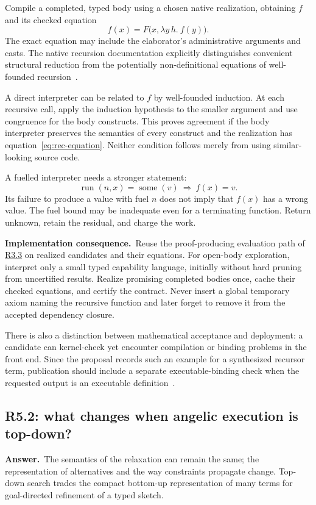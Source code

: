 \documentclass[11pt,a4paper]{article}
\theoremstyle{definition}
\theoremstyle{remark}
\newcommand{\ans}{\noindent\textbf{Answer.}\ }
\newcommand{\imp}{\par\noindent\textbf{Implementation consequence.}\ }
\newcommand{\qref}[1]{\hyperref[q:#1]{#1}}
\begin{document}
Compile a completed, typed body using a chosen native realization, obtaining
$f$ and its checked equation
\begin{equation}\label{eq:rec-equation}
 f(x)=F\bigl(x,\lambda y\,h.\ f(y)\bigr).
\end{equation}
The exact equation may include the elaborator's administrative arguments and
casts. The native recursion documentation explicitly distinguishes convenient
structural reduction from the potentially non-definitional equations of
well-founded recursion~\cite{lean-recursion}.

A direct interpreter can be related to $f$ by well-founded induction. At each
recursive call, apply the induction hypothesis to the smaller argument and
use congruence for the body constructs. This proves agreement if the body
interpreter preserves the semantics of every construct and the realization
has equation~\eqref{eq:rec-equation}. Neither condition follows merely from
using similar-looking source code.

A fuelled interpreter needs a stronger statement:
\[
 \operatorname{run}(n,x)=\operatorname{some}(v)\ \Longrightarrow\ f(x)=v.
\]
Its failure to produce a value with fuel $n$ does not imply that $f(x)$ has a
wrong value. The fuel bound may be inadequate even for a terminating function.
Return unknown, retain the residual, and charge the work.

\imp Reuse the proof-producing evaluation path of \qref{R3.3} on realized
candidates and their equations. For open-body exploration, interpret only a
small typed capability language, initially without hard pruning from
uncertified results. Realize promising completed bodies once, cache their
checked equations, and certify the contract. Never insert a global temporary
axiom naming the recursive function and later forget to remove it from the
accepted dependency closure.

There is also a distinction between mathematical acceptance and deployment:
a candidate can kernel-check yet encounter compilation or binding problems in
the front end. Since the proposal records such an example for a synthesized
recursor term, publication should include a separate executable-binding check
when the requested output is an executable definition~\cite{proposal-evidence}.

\subsection{R5.2: what changes when angelic execution is top-down?}\label{q:R5.2}
\ans The semantics of the relaxation can remain the same; the representation
of alternatives and the way constraints propagate change. Top-down search
trades the compact bottom-up representation of many terms for goal-directed
refinement of a typed sketch.
\end{document}
